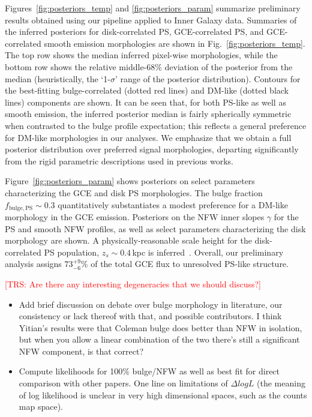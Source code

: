 \documentclass[prd,aps,10pt,nofootinbib,twocolumn,superscriptaddress,preprintnumbers,balancelastpage,longbibliography,floatfix]{revtex4-2}
\def\trs#1{\textcolor{red}{[TRS: #1]}}
\begin{document}
Figures~\ref{fig:posteriors_temp} and \ref{fig:posteriors_param} summarize preliminary results obtained using our pipeline applied to Inner Galaxy \Fermi data. Summaries of the inferred posteriors for disk-correlated PS, GCE-correlated PS, and GCE-correlated smooth emission morphologies are shown in Fig.~\ref{fig:posteriors_temp}. The top row shows the median inferred pixel-wise morphologies, while the bottom row shows the relative middle-68\% deviation of the posterior from the median (heuristically, the `1-$\sigma$' range of the posterior distribution). Contours for the best-fitting bulge-correlated (dotted red lines) and DM-like (dotted black lines) components are shown. It can be seen that, for both PS-like as well as smooth emission, the inferred posterior median is fairly spherically symmetric when contrasted to the bulge profile expectation; this reflects a general preference for DM-like morphologies in our analyses. We emphasize that we obtain a full posterior distribution over preferred signal morphologies, departing significantly from the rigid parametric descriptions used in previous works.

Figure~\ref{fig:posteriors_param} shows posteriors on select parameters characterizing the GCE and disk PS morphologies. The bulge fraction $f_\mathrm{bulge, PS}\sim 0.3$ quantitatively substantiates a modest preference for a DM-like morphology in the GCE emission. Posteriors on the NFW inner slopes $\gamma$ for the PS and smooth NFW profiles, as well as select parameters characterizing the disk morphology are shown. A physically-reasonable scale height for the disk-correlated PS population, $z_s\sim 0.4$\,kpc is inferred~\cite{bartels2018bayesian}. Overall, our preliminary analysis assigns $73^{+9}_{-6}\%$ of the total GCE flux to unresolved PS-like structure.

\trs{Are there any interesting degeneracies that we should discuss?}

\begin{itemize}
\item Add brief discussion on debate over bulge morphology in literature, our consistency or lack thereof with that, and possible contributors. I think Yitian's results were that Coleman bulge does better than NFW in isolation, but when you allow a linear combination of the two there's still a significant NFW component, is that correct?
\item Compute likelihoods for 100\% bulge/NFW as well as best fit for direct comparison with other papers. One line on limitations of $\Delta log L$ (the meaning of log likelihood is unclear in very high dimensional spaces, such as the counts map space).
\end{itemize}
\end{document}
